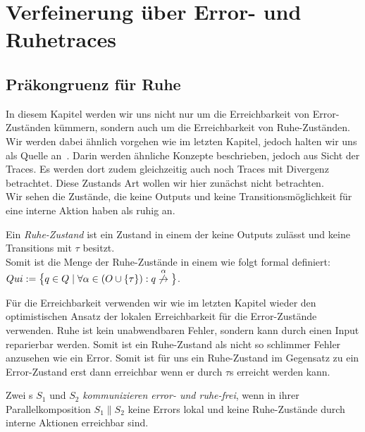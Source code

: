 \chapter{Verfeinerung über Error- und Ruhetraces}

\section{Präkongruenz für Ruhe}

In diesem Kapitel werden wir uns nicht nur um die Erreichbarkeit von
Error-Zuständen kümmern, sondern auch um die Erreichbarkeit von
Ruhe-Zuständen. Wir werden dabei ähnlich vorgehen wie im letzten Kapitel,
jedoch halten wir uns als Quelle an~\cite{Chilton2013}. Darin werden ähnliche
Konzepte beschrieben, jedoch aus Sicht der Traces. Es werden dort zudem
gleichzeitig auch noch Traces mit Divergenz betrachtet. Diese Zustands Art
wollen wir hier zunächst nicht betrachten.\\
Wir sehen die Zustände, die keine Outputs und keine Transitionsmöglichkeit für
eine interne Aktion haben als ruhig an.

\begin{Def}[Ruhe]
  Ein \emph{Ruhe-Zustand} ist ein Zustand in einem \EIO{} der keine
  Outputs zulässt und keine Transitions mit $\tau$ besitzt.\\
  Somit ist die Menge der Ruhe-Zustände in einem \EIO{} wie folgt formal
  definiert: $Qui:=\big\{q\in Q\mid \forall \alpha\in (O\cup \{\tau\}): q
  \overset{\alpha}{\not{\hspace{-0.1cm}\rightarrow}}\big\}$.
\end{Def}

Für die Erreichbarkeit verwenden wir wie im letzten Kapitel wieder den
optimistischen Ansatz der lokalen Erreichbarkeit für die Error-Zustände
verwenden. Ruhe ist kein unabwendbaren Fehler, sondern kann durch einen Input
reparierbar werden. Somit ist ein Ruhe-Zustand als nicht so \glqq{}schlimmer
Fehler\grqq{} anzusehen wie ein Error. Somit ist für uns ein Ruhe-Zustand im
Gegensatz zu ein Error-Zustand erst dann erreichbar wenn er durch $\tau$s
erreicht werden kann.

\begin{Def}
  Zwei \EIO{}s $S_1$ und $S_2$ \emph{kommunizieren error- und ruhe-frei}, wenn
  in ihrer Parallelkomposition $S_1\| S_2$ keine Errors lokal und keine
  Ruhe-Zustände durch interne Aktionen erreichbar sind.
\end{Def}

